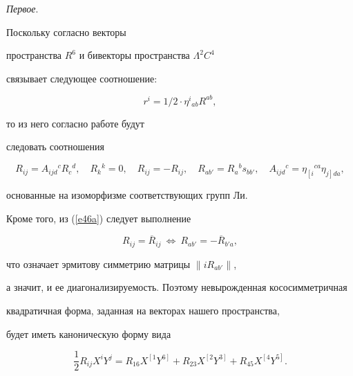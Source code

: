 {\it Первое}.


Поскольку согласно \cite{6} векторы


пространства $R^6$ и бивекторы пространства $\Lambda^2C^4$


связывает следующее соотношение:


$$




r^i=1/2\cdot \eta^i{}_{ab}R^{ab},


$$


то из него согласно работе \cite{8} будут


следовать соотношения


$$




R_{ij}= A_{ij d}{}^cR_c{}^d,\quad


R_k{}^k=0,\quad R_{ij}=-R_{ij},\quad


R_{ab'}=R_a{}^b s_{bb'},\quad


A_{ij d}{}^c=\eta_{\left[\right. i}{}^{ca}\eta_{j\left.\right] da},


$$


основанные на изоморфизме соответствующих групп Ли.


Кроме того, из (\ref{e46a}) следует выполнение


$$




R_{ij}=\overline R_{ij}\ \Leftrightarrow \


R_{ab'}=-\overline R_{b'a},


$$


что означает эрмитову симметрию матрицы $\|iR_{ab'}\|$,


а значит, и ее диагонализируемость. Поэтому невырожденная кососимметричная


квадратичная форма, заданная на векторах нашего пространства,


будет иметь каноническую форму вида


$$




\frac{1}{2}R_{ij}X^i Y^j=


R_{16}X^{\left[\right.1}Y^{6\left.\right]}+


R_{23}X^{\left[\right.2}Y^{3\left.\right]}+


R_{45}X^{\left[\right.4}Y^{5\left.\right]}.


$$





